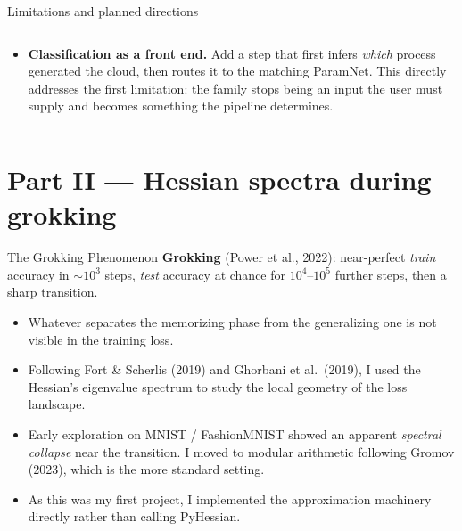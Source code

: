 \documentclass[aspectratio=169,10pt]{beamer}
\begin{document}
\begin{frame}{Limitations and planned directions}
\begin{columns}[T,onlytextwidth]
\begin{column}{0.48\textwidth}
{\begin{itemize}
        not typically the final quantity of interest: they are an intermediate step
        toward properties we actually want. Yip et al.\ (2025)
        map persistence images of a halo catalogue straight to the cosmological
        parameters $(\Omega_m, \sigma_8)$, without estimating $(\kappa,\mu,\sigma)$.
  \item \textbf{Classification as a front end.} Add a step that first infers
        \emph{which} process generated the cloud, then routes it to the matching
        ParamNet. This directly addresses the first limitation: the family stops
        being an input the user must supply and becomes something the pipeline
        determines.
\end{itemize}}
\end{column}
\end{columns}
\end{frame}

\section{Part II --- Hessian spectra during grokking}

\begin{frame}{The Grokking Phenomenon}
\textbf{Grokking} (Power et al., 2022): near-perfect \emph{train} accuracy in
$\sim\!10^3$ steps, \emph{test} accuracy at chance for $10^4$--$10^5$ further
steps, then a sharp transition.
\vspace{6pt}
\begin{itemize}
  \item Whatever separates the memorizing phase from the generalizing one is
        \alert{not visible in the training loss}.
  \item Following Fort \& Scherlis (2019)
        and Ghorbani et al.\ (2019), I used the Hessian's eigenvalue spectrum to study the local geometry of the loss landscape.
  \item Early exploration on MNIST / FashionMNIST showed an apparent
        \emph{spectral collapse} near the transition. I moved to modular
        arithmetic following Gromov (2023), which is the more standard setting.
  \item As this was my first project, I implemented the approximation machinery
        directly rather than calling PyHessian.
\end{itemize}
\end{frame}
\end{document}
